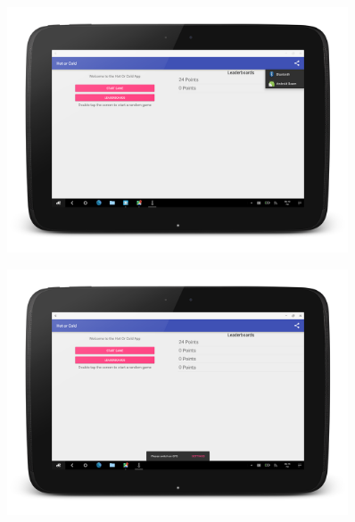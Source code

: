 \documentclass[10pt, a4paper]{article}
\begin{document}
\begin{figure}[!htb]
%
\begin{center}
  \includegraphics[width=0.9\textwidth]{tablet_share_1}
  \caption{}
\end{center}
\endminipage
\end{figure}

\begin{figure}[!htb]
%
\begin{center}
  \includegraphics[width=0.9\textwidth]{tablet_snackbar_1}
  \caption{}
\end{center}
\endminipage
\end{figure}
\end{document}
